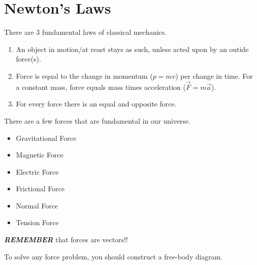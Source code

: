 \section{Newton's Laws} \label{sec:Newtons Laws}
There are 3 fundamental laws of classical mechanics.

\begin{enumerate}
  \item An object in motion/at reast stays as such, unless acted upon by an outide force(s).
  \item Force is equal to the change in momentum ($p=mv$) per change in time. For a constant mass, force equals mass times acceleration ($\vec{F} = m \vec{a}$).
  \item For every force there is an equal and opposite force.
\end{enumerate}

There are a few forces that are fundamental in our universe.

\begin{itemize}[noitemsep, nolistsep]
  \item Gravitational Force
  \item Magnetic Force
  \item Electric Force
  \item Frictional Force
  \item Normal Force
  \item Tension Force
\end{itemize}

\begin{remark*}
  \textbf{\emph{REMEMBER}} that forces are vectors!!
\end{remark*}

To solve any force problem, you should construct a free-body diagram.

